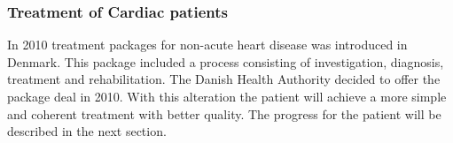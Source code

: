 
\subsubsection{Treatment of Cardiac patients}

In 2010 treatment packages for non-acute heart disease was introduced in Denmark. This package included a process consisting of investigation, diagnosis, treatment and rehabilitation. The Danish Health Authority decided to offer the package deal in 2010. With this alteration the patient will achieve a more simple and coherent treatment with better quality. 
The progress for the patient will be described in the next section. \\

